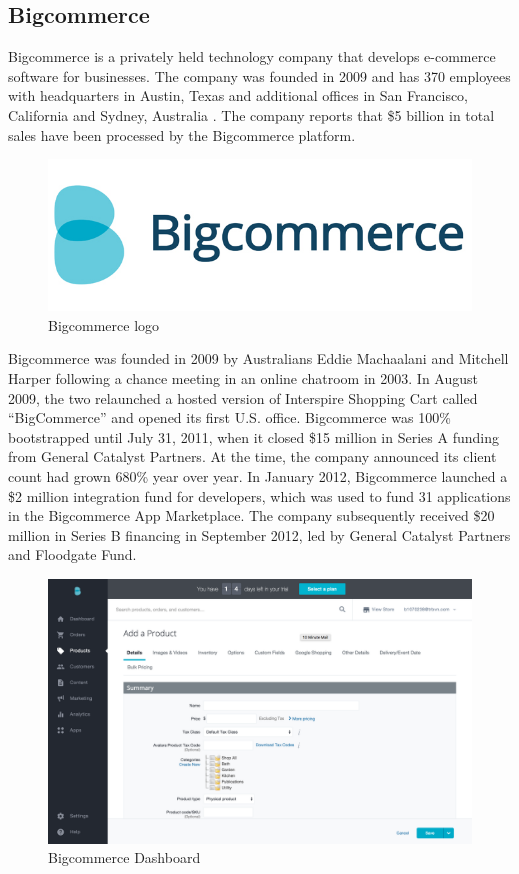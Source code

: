 \subsection{Bigcommerce}
Bigcommerce is a privately held technology company that develops e-commerce software for businesses. The company was founded in 2009 and has 370 employees with headquarters in Austin, Texas and additional offices in San Francisco, California and Sydney, Australia \cite{bigcommerce_overview}.
The company reports that \$5 billion in total sales have been processed by the Bigcommerce platform.
\begin{figure}[htb]
  \centering
  \includegraphics[width=0.5\linewidth]{images/chapter1/bigcommerce_logo.jpg}\hfill
  \caption[Bigcommerce logo]{Bigcommerce logo}
  \label{fig:ebay_logo}
\end{figure}
Bigcommerce was founded in 2009 by Australians Eddie Machaalani and Mitchell Harper following a chance meeting in an online chatroom in 2003. In August 2009, the two relaunched a hosted version of Interspire Shopping Cart called “BigCommerce” and opened its first U.S. office.
\newline
Bigcommerce was 100\% bootstrapped until July 31, 2011, when it closed \$15 million in Series A funding from General Catalyst Partners. At the time, the company announced its client count had grown 680\% year over year. In January 2012, Bigcommerce launched a \$2 million integration fund for developers, which was used to fund 31 applications in the Bigcommerce App Marketplace. The company subsequently received \$20 million in Series B financing in September 2012, led by General Catalyst Partners and Floodgate Fund.
\begin{figure}[htb]
 \centering
 \includegraphics[width=1.0\linewidth]{images/chapter1/ex-bigcommerce.png}\hfill
 \caption[Bigcommerce Dashboard]{Bigcommerce Dashboard}
 \label{fig:shopify_dashboard}
\end{figure}

